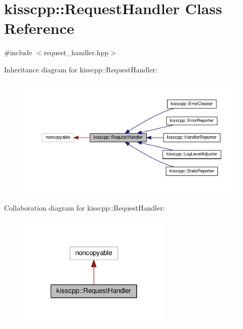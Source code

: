 \hypertarget{classkisscpp_1_1_request_handler}{\section{kisscpp\-:\-:Request\-Handler Class Reference}
\label{classkisscpp_1_1_request_handler}
}


{\ttfamily \#include $<$request\-\_\-handler.\-hpp$>$}



Inheritance diagram for kisscpp\-:\-:Request\-Handler\-:
\nopagebreak
\begin{figure}[H]
\begin{center}
\leavevmode
\includegraphics[width=350pt]{classkisscpp_1_1_request_handler__inherit__graph}
\end{center}
\end{figure}


Collaboration diagram for kisscpp\-:\-:Request\-Handler\-:\nopagebreak
\begin{figure}[H]
\begin{center}
\leavevmode
\includegraphics[width=206pt]{classkisscpp_1_1_request_handler__coll__graph}
\end{center}
\end{figure}
